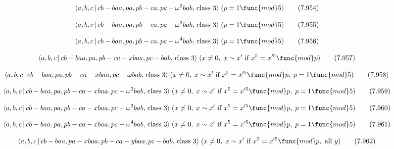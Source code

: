 \documentclass[10pt]{article}
\begin{document}
\begin{equation}
\langle a,b,c\,|\,cb-baa,pa,pb-ca,pc-\omega ^{2}bab,\,\text{class }3\rangle
\;(p=1\func{mod}5)  \tag{7.954}
\end{equation}

\begin{equation}
\langle a,b,c\,|\,cb-baa,pa,pb-ca,pc-\omega ^{3}bab,\,\text{class }3\rangle
\;(p=1\func{mod}5)  \tag{7.955}
\end{equation}

\begin{equation}
\langle a,b,c\,|\,cb-baa,pa,pb-ca,pc-\omega ^{4}bab,\,\text{class }3\rangle
\;(p=1\func{mod}5)  \tag{7.956}
\end{equation}

\begin{equation}
\langle a,b,c\,|\,cb-baa,pa,pb-ca-xbaa,pc-bab,\,\text{class }3\rangle
\;(x\neq 0,\;x\sim x^{\prime }\text{ if }x^{5}=x^{\prime 5}\func{mod}p) 
\tag{7.957}
\end{equation}

\begin{equation}
\langle a,b,c\,|\,cb-baa,pa,pb-ca-xbaa,pc-\omega bab,\,\text{class }3\rangle
\;(x\neq 0,\;x\sim x^{\prime }\text{ if }x^{5}=x^{\prime 5}\func{mod}p,\;p=1%
\func{mod}5)  \tag{7.958}
\end{equation}

\begin{equation}
\langle a,b,c\,|\,cb-baa,pa,pb-ca-xbaa,pc-\omega ^{2}bab,\,\text{class }%
3\rangle \;(x\neq 0,\;x\sim x^{\prime }\text{ if }x^{5}=x^{\prime 5}\func{mod%
}p,\;p=1\func{mod}5)  \tag{7.959}
\end{equation}

\begin{equation}
\langle a,b,c\,|\,cb-baa,pa,pb-ca-xbaa,pc-\omega ^{3}bab,\,\text{class }%
3\rangle \;(x\neq 0,\;x\sim x^{\prime }\text{ if }x^{5}=x^{\prime 5}\func{mod%
}p,\;p=1\func{mod}5)  \tag{7.960}
\end{equation}

\begin{equation}
\langle a,b,c\,|\,cb-baa,pa,pb-ca-xbaa,pc-\omega ^{4}bab,\,\text{class }%
3\rangle \;(x\neq 0,\;x\sim x^{\prime }\text{ if }x^{5}=x^{\prime 5}\func{mod%
}p,\;p=1\func{mod}5)  \tag{7.961}
\end{equation}

\begin{equation}
\langle a,b,c\,|\,cb-baa,pa-xbaa,pb-ca-ybaa,pc-bab,\,\text{class }3\rangle
\;(x\neq 0,\;x\sim x^{\prime }\text{ if }x^{5}=x^{\prime 5}\func{mod}p,\text{
all }y)  \tag{7.962}
\end{equation}
\end{document}
